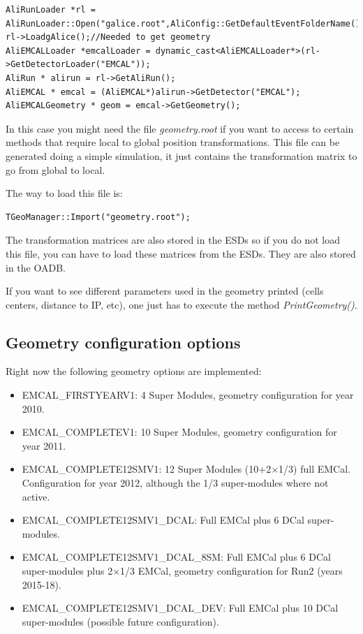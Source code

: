 \begin{DDbox}{\linewidth}
\begin{lstlisting}
AliRunLoader *rl = AliRunLoader::Open("galice.root",AliConfig::GetDefaultEventFolderName(),"read"); 
rl->LoadgAlice();//Needed to get geometry
AliEMCALLoader *emcalLoader = dynamic_cast<AliEMCALLoader*>(rl->GetDetectorLoader("EMCAL"));
AliRun * alirun = rl->GetAliRun();
AliEMCAL * emcal = (AliEMCAL*)alirun->GetDetector("EMCAL"); AliEMCALGeometry * geom = emcal->GetGeometry();
\end{lstlisting}
\end{DDbox}

In this case you might need the file {\it geometry.root} if you want to access to certain methods that require local to global position transformations. This file can be generated doing a simple simulation, it just contains the transformation matrix to go from global to local.

The way to load this file is:
\begin{lstlisting}
TGeoManager::Import("geometry.root");
\end{lstlisting}

The transformation matrices are also stored in the ESDs so if you do not load this file, you can have to load these matrices from the ESDs. They are also stored in the OADB.

 If you want to see different parameters used in the geometry printed (cells centers, distance to IP, etc), one just has to execute the method {\it PrintGeometry()}.
 
\subsection{Geometry configuration options}
Right now the following geometry options are implemented:
\begin{itemize}
\item EMCAL\_FIRSTYEARV1: 4 Super Modules, geometry  configuration for year 2010.
\item EMCAL\_COMPLETEV1: 10 Super Modules, geometry configuration for year 2011.
\item EMCAL\_COMPLETE12SMV1: 12 Super Modules (10+2$\times$1/3) full EMCal. Configuration for year 2012, although the 1/3 super-modules where not active.
\item EMCAL\_COMPLETE12SMV1\_DCAL: Full EMCal plus 6 DCal super-modules.
\item EMCAL\_COMPLETE12SMV1\_DCAL\_8SM: Full EMCal plus 6 DCal super-modules plus 2$\times$1/3 EMCal, geometry configuration for Run2 (years 2015-18).
\item EMCAL\_COMPLETE12SMV1\_DCAL\_DEV: Full EMCal plus  10 DCal super-modules (possible future configuration).
\end{itemize}

